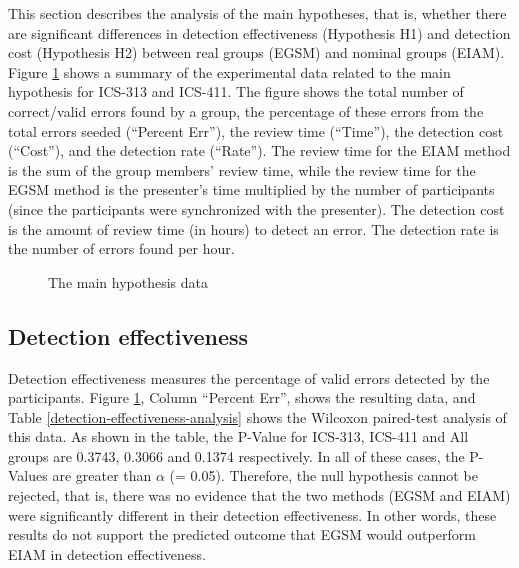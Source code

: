 This section describes the analysis of the main hypotheses, that is,
whether there are significant differences in detection effectiveness
(Hypothesis H1) and detection cost (Hypothesis H2) between  real groups
(EGSM) and nominal groups (EIAM).  Figure \ref{main-hypothesis} shows
a summary of the experimental data related to the main hypothesis for
ICS-313 and ICS-411. The
figure shows the total number of correct/valid errors found by a
group, the percentage of these errors from the total errors seeded
(``Percent Err''),
the review time (``Time''), the detection cost (``Cost''),
and the detection rate (``Rate'').  The
review time for the EIAM method is the sum of the group
members' review time, while the review time for the EGSM method is the
presenter's time multiplied by the number of participants (since the
participants were synchronized with the presenter). The detection cost
is the amount of review time (in hours) to detect an error. The
detection rate is 
the number of errors found per hour.

\begin{figure}[htb]
 {\centerline{}}
 \caption{The main hypothesis data}
 \label{main-hypothesis}
\end{figure}


\subsection{Detection effectiveness} 
\label{sec:detection-effectiveness}

Detection effectiveness measures the percentage of valid errors
detected by the participants. Figure \ref{main-hypothesis}, Column
``Percent Err'', shows the resulting data, and Table
\ref{detection-effectiveness-analysis} shows the  
Wilcoxon paired-test analysis of this data.
As shown in the table, the P-Value for ICS-313, ICS-411 and All groups
are 0.3743, 0.3066 and 0.1374 respectively.
In all of these cases, the P-Values are greater than
$\alpha$ (= 0.05). Therefore,  the null hypothesis cannot be rejected, that
is, there was no evidence that the two methods (EGSM and EIAM) were
significantly different in their detection effectiveness. 
In other words, these results do not support the predicted outcome that
EGSM would outperform EIAM in detection effectiveness. 


